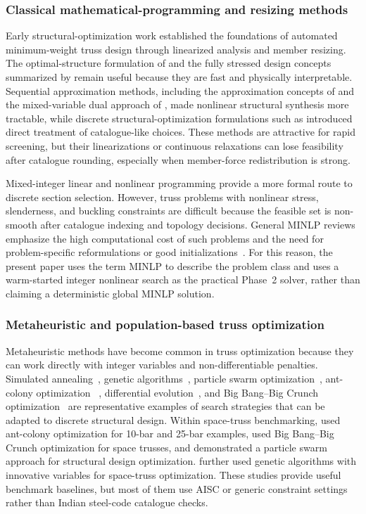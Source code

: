 \documentclass[lineno,pdflatex,sn-mathphys-num]{sn-jnl}
\begin{document}
\subsubsection{Classical mathematical-programming and resizing methods}

Early structural-optimization work established the foundations of automated
minimum-weight truss design through linearized analysis and member resizing.
The optimal-structure formulation of \citet{Dorn1964} and the fully stressed
design concepts summarized by \citet{Gallagher1973} remain useful because
they are fast and physically interpretable. Sequential approximation methods,
including the approximation concepts of \citet{Schmit1974} and the mixed-variable
dual approach of \citet{Fleury1986}, made nonlinear structural synthesis more
tractable, while discrete structural-optimization formulations such as
\citet{Ringertz1988} introduced direct treatment of catalogue-like choices.
These methods are attractive for rapid screening, but their linearizations or
continuous relaxations can lose feasibility after catalogue rounding, especially
when member-force redistribution is strong.

Mixed-integer linear and nonlinear programming provide a more formal route to
discrete section selection. However, truss problems with nonlinear stress,
slenderness, and buckling constraints are difficult because the feasible set is
non-smooth after catalogue indexing and topology decisions. General MINLP
reviews emphasize the high computational cost of such problems and the need for
problem-specific reformulations or good initializations~\citep{Belotti2013}.
For this reason, the present paper uses the term MINLP to describe the problem
class and uses a warm-started integer nonlinear search as the practical Phase~2
solver, rather than claiming a deterministic global MINLP solution.

\subsubsection{Metaheuristic and population-based truss optimization}

Metaheuristic methods have become common in truss optimization because they can
work directly with integer variables and non-differentiable penalties. Simulated
annealing~\citep{Kirkpatrick1983}, genetic algorithms~\citep{Holland1975},
particle swarm optimization~\citep{Kennedy1995}, ant-colony optimization
~\citep{Dorigo1997}, differential evolution~\citep{Storn1997}, and
Big Bang--Big Crunch optimization~\citep{Erol2006} are representative examples
of search strategies that can be adapted to discrete structural design.
Within space-truss benchmarking, \citet{Camp2004} used ant-colony optimization
for 10-bar and 25-bar examples, \citet{Camp2007} used Big Bang--Big Crunch
optimization for space trusses, and \citet{Perez2007} demonstrated a particle
swarm approach for structural design optimization. \citet{Shallan2014} further
used genetic algorithms with innovative variables for space-truss optimization.
These studies provide useful benchmark baselines, but most of them use AISC or
generic constraint settings rather than Indian steel-code catalogue checks.
\end{document}
